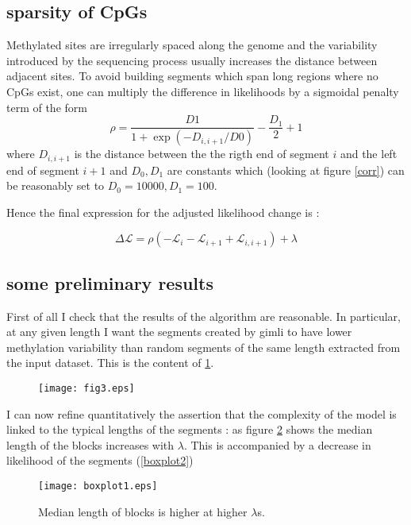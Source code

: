 \documentclass[12pt]{amsart}
\newcommand{\lik}{\ensuremath{\mathcal{L}}}
\begin{document}
\subsection{sparsity of CpGs}

Methylated sites are irregularly spaced along the genome and the variability 
introduced by the sequencing process usually increases the distance 
between adjacent sites.
To avoid building segments which span long regions where no CpGs exist, one 
can multiply the difference in likelihoods by a sigmoidal penalty term of the
form \[\rho=\frac{D1}{1+\exp(-D_{i,i+1}/D0)}-\frac{D_1}{2}+1\] where $D_{i,i+1}$ is the distance 
between the the rigth end of segment $i$ and the left end of segment $i+1$ and 
$D_0,D_1$ are constants which (looking at figure \ref{corr}) can be reasonably 
set to $D_0=10000,D_1=100$. 

Hence the final expression for the adjusted likelihood change is :

\begin{equation}
\Delta \lik = \rho ( -\mathcal{L}_i-\mathcal{L}_{i+1}+\mathcal{L}_{i,i+1} )  +\lambda
\end{equation}


\subsection{some preliminary results}

First of all I check that the results of the algorithm are reasonable.
In particular, at any given length I want the segments created by gimli to have lower methylation
variability than random segments of the same length extracted from the input dataset. This is the content of
\ref{fig3}.

\begin{figure}\label{fig3}
\texttt{[image: fig3.eps]}
\caption{}
\end{figure}

I can now refine quantitatively the assertion that the complexity of the model
is linked to the typical lengths of the segments : as figure \ref{boxplot1} 
shows the median length of the blocks increases with $\lambda$. This is 
accompanied by a decrease in likelihood of the segments (\ref{boxplot2})

\begin{figure}\label{boxplot1}
\texttt{[image: boxplot1.eps]}
\caption{Median length of blocks is higher at higher $\lambda$s.}
\end{figure}
\end{document}
